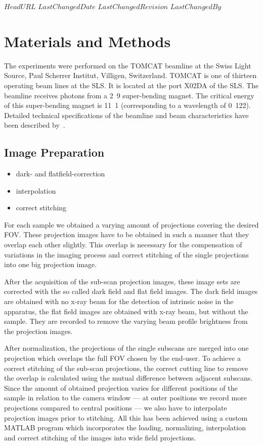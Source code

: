 \svnidlong
{$HeadURL$}
{$LastChangedDate$}
{$LastChangedRevision$}
{$LastChangedBy$}
\section{Materials and Methods}
\label{sec:materials and methods}
The experiments were performed on the TOMCAT beamline at the Swiss Light Source, Paul Scherrer Institut, Villigen, Switzerland. TOMCAT is one of thirteen operating beam lines at the SLS. It is located at the port X02DA of the SLS. The beamline receives photons from a \unit{2.9}{\tesla} super-bending magnet. The critical energy of this super-bending magnet is \unit{11.1}{\kilo\electronvolt} (corresponding to a wavelength of \unit{0.122}{\nano\meter}). Detailed technical specifications of the beamline and beam characteristics have been described by~\citet{Stampanoni2006a,Stampanoni2007}.

\subsection{Image Preparation}
\label{subsec:image preparation}
\begin{itemize}
	\item dark- and flatfield-correction
	\item interpolation
	\item correct stitching
\end{itemize}
For each sample we obtained a varying amount of projections covering the desired FOV. These projection images have to be obtained in such a manner that they overlap each other slightly. This overlap is necessary for the compensation of variations in the imaging process and correct stitching of the single projections into one big projection image. 

After the acquisition of the sub-scan projection images, these image sets are corrected with the so called dark field and flat field images. The dark field images are obtained with no x-ray beam for the detection of intrinsic noise in the apparatus, the flat field images are obtained with x-ray beam, but without the sample. They are recorded to remove the varying beam profile brightness from the projection images.

After normalization, the projections of the single subscans are merged into one projection which overlaps the full FOV chosen by the end-user. To achieve a correct stitching of the sub-scan projections, the correct cutting line to remove the overlap is calculated using the mutual difference between adjacent subscans. Since the amount of obtained projection varies for different positions of the sample in relation to the camera window --- at outer positions we record more projections compared to central positions --- we also have to interpolate projection images prior to stitching. All this has been achieved using a custom MATLAB\textsuperscript{\textregistered} program which incorporates the loading, normalizing, interpolation and correct stitching of the images into wide field projections.

